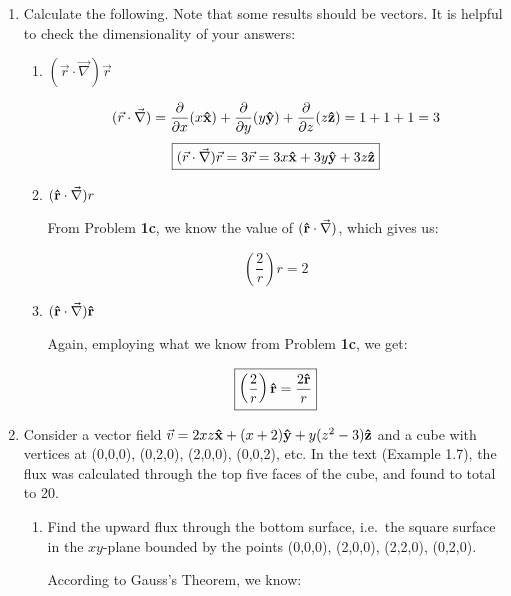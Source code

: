 \begin{enumerate}
\begin{enumerate}
\begin{itemize}
        \end{itemize}

    \end{enumerate}

  \item Calculate the following. Note that some results should be vectors.  It is helpful to check the dimensionality of your answers:

    \begin{enumerate}

      \item $(\vec{r}\cdot\vec{\nabla})\vec{r}$

        $$(\vec{r}\cdot\vec{\nabla})=\frac{\partial}{\partial x}(x\bold{\hat{x}})+\frac{\partial}{\partial y} (y\bold{\hat{y}})+\frac{\partial}{\partial z}(z\bold{\hat{z}})=1+1+1=3$$
        $$\boxed{(\vec{r}\cdot\vec{\nabla})\vec{r}=3\vec{r}=3x\bold{\hat{x}}+3y\bold{\hat{y}}+3z\bold{\hat{z}}}$$

      \item $(\bold{\hat{r}}\cdot\vec{\nabla})r$

        From Problem \textbf{1c}, we know the value of $(\bold{\hat{r}}\cdot\vec{\nabla})$, which gives us:

        $$\boxed{\left( \frac{2}{r} \right)r=2}$$

      \item $(\bold{\hat{r}}\cdot\vec{\nabla})\bold{\hat{r}}$

        Again, employing what we know from Problem \textbf{1c}, we get:

        $$\boxed{\left( \frac{2}{r} \right)\bold{\hat{r}}=\frac{2\bold{\hat{r}}}{r}}$$

    \end{enumerate}

  \item Consider a vector field $\vec{v}=2xz\bold{\hat{x}}+(x+2)\bold{\hat{y}}+y(z^2-3)\bold{\hat{z}}$ and a cube with vertices at (0,0,0), (0,2,0), (2,0,0), (0,0,2), etc. In the text (Example 1.7), the flux was calculated through the top five faces of the cube, and found to total to 20.

    \begin{enumerate}

      \item Find the upward flux through the bottom surface, i.e.\ the square surface in the $xy$-plane bounded by the points (0,0,0), (2,0,0), (2,2,0), (0,2,0).

        According to Gauss's Theorem, we know:


\end{enumerate}
\end{enumerate}
